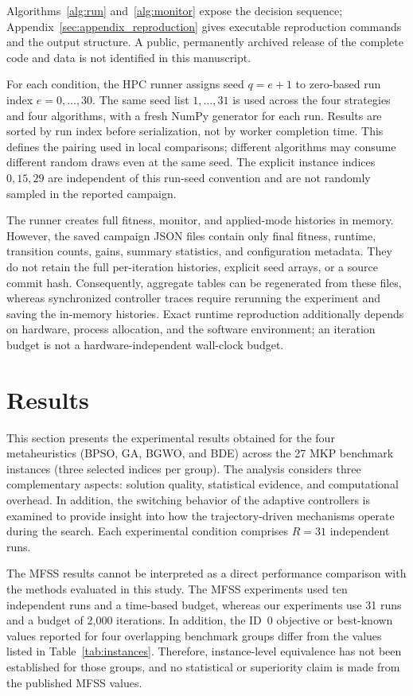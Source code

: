 \documentclass[journal,article,submit,moreauthors]{Definitions/mdpi}
\begin{document}
Algorithms~\ref{alg:run} and~\ref{alg:monitor} expose the decision sequence;
Appendix~\ref{sec:appendix_reproduction} gives executable reproduction
commands and the output structure. A public, permanently archived release
of the complete code and data is not identified in this manuscript.

For each condition, the HPC runner assigns seed $q=e+1$ to zero-based run
index $e=0,\ldots,30$. The same seed list $1,\ldots,31$ is used across the
four strategies and four algorithms, with a fresh NumPy generator for each
run. Results are sorted by run index before serialization, not by worker
completion time. This defines the pairing used in local comparisons;
different algorithms may consume different random draws even at the same
seed. The explicit instance indices $0,15,29$ are independent of this
run-seed convention and are not randomly sampled in the reported campaign.

The runner creates full fitness, monitor, and applied-mode histories in
memory. However, the saved campaign JSON files contain only final fitness,
runtime, transition counts, gains, summary statistics, and configuration
metadata. They do not retain the full per-iteration histories, explicit
seed arrays, or a source commit hash. Consequently, aggregate tables can
be regenerated from these files, whereas synchronized controller traces
require rerunning the experiment and saving the in-memory histories.
Exact runtime reproduction additionally depends on hardware, process
allocation, and the software environment; an iteration budget is not a
hardware-independent wall-clock budget.

\section{Results}
\label{sec:results}

This section presents the experimental results obtained for the four
metaheuristics (BPSO, GA, BGWO, and BDE) across the 27 MKP benchmark
instances (three selected indices per group). The analysis considers three complementary aspects: solution
quality, statistical evidence, and computational overhead. In addition,
the switching behavior of the adaptive controllers is examined to provide
insight into how the trajectory-driven mechanisms operate during the search.
Each experimental condition comprises $R=31$ independent runs.


   The MFSS results cannot be interpreted as a direct performance comparison with the methods evaluated in this study. The
 MFSS experiments used ten independent runs and a time-based budget, whereas our experiments use 31 runs and a budget of 2,000
 iterations. In addition, the ID~0 objective or best-known values reported for four overlapping benchmark groups differ from
 the values listed in Table~\ref{tab:instances}. Therefore, instance-level equivalence has not been established for those
 groups, and no statistical or superiority claim is made from the published MFSS values.
\end{document}
